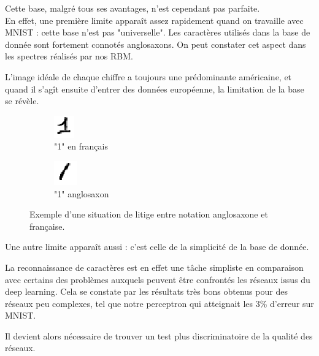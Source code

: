 \documentclass[a4paper,oneside]{report}
\begin{document}
                Cette base, malgré tous ses avantages, n'est cependant pas parfaite.\\

                En effet, une première limite apparaît assez rapidement quand on travaille avec MNIST 
: cette base n'est pas "universelle". Les caractères utilisés dans la base de donnée 
sont fortement connotés 
anglosaxons. On peut constater cet aspect dans les spectres réalisés par nos RBM.

                L'image idéale de chaque chiffre a toujours une prédominante américaine, et quand il 
s'agît ensuite d'entrer des données européenne, la limitation de la base se révèle.\\

                \begin{figure}
                    \centering
                    \begin{subfigure}[b]{0.3\textwidth}
                        \centering
                        \includegraphics{Images/mnist-02.png}
                        \caption{"1" en français}
                    \end{subfigure}
                    \hfill
                    \begin{subfigure}[b]{0.3\textwidth}
                        \centering
                        \includegraphics{Images/mnist-03.png}
                        \caption{"1" anglosaxon}
                    \end{subfigure}
                    \caption{Exemple d'une situation de litige entre notation anglosaxone et française.}
                \end{figure}

        Une autre limite apparaît aussi : c'est celle de la simplicité de la base de donnée.

La reconnaissance de caractères est en effet une tâche simpliste en comparaison avec 
certains des problèmes auxquels peuvent être confrontés les réseaux issus du deep 
learning. Cela se constate par 
les résultats très bons obtenus pour des réseaux peu complexes, tel que notre perceptron qui 
atteignait les 3\% d'erreur sur MNIST.

  Il devient alors nécessaire de trouver un test plus discriminatoire de la qualité des 
réseaux.\\
\end{document}
